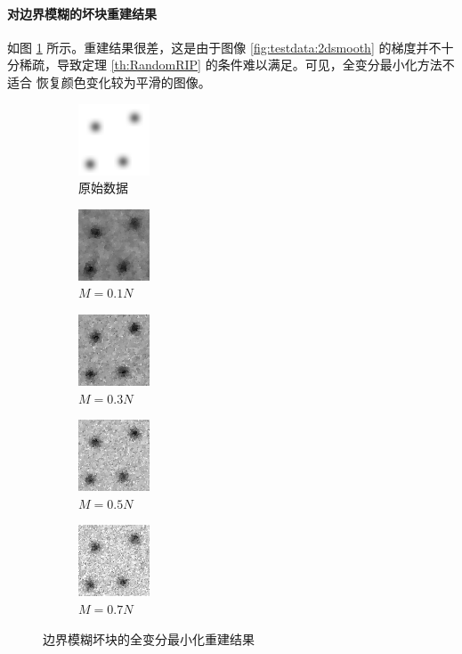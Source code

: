 \paragraph{对边界模糊的坏块重建结果} 如图 \ref{fig:TV2dsmooth}
所示。重建结果很差，这是由于图像
\ref{fig:testdata:2dsmooth} 的梯度并不十分稀疏，导致定理
\ref{th:RandomRIP} 的条件难以满足。可见，全变分最小化方法不适合
恢复颜色变化较为平滑的图像。

\begin{figure}
\centering
\begin{subfigure}[t]{1.1in}
	\includegraphics{Figure/testdata/2dsmooth.png}
	\caption{原始数据}
\end{subfigure}
\begin{subfigure}[t]{1.1in}
	\includegraphics{Figure/TV/2dsmooth10.png}
	\caption{$M = 0.1 N$}
\end{subfigure}
\begin{subfigure}[t]{1.1in}
	\includegraphics{Figure/TV/2dsmooth30.png}
	\caption{$M = 0.3 N$}
\end{subfigure}
\begin{subfigure}[t]{1.1in}
	\includegraphics{Figure/TV/2dsmooth50.png}
	\caption{$M = 0.5 N$}
\end{subfigure}
\begin{subfigure}[t]{1.1in}
	\includegraphics{Figure/TV/2dsmooth70.png}
	\caption{$M = 0.7 N$}
\end{subfigure}
\caption{边界模糊坏块的全变分最小化重建结果}
\label{fig:TV2dsmooth}
\end{figure}

